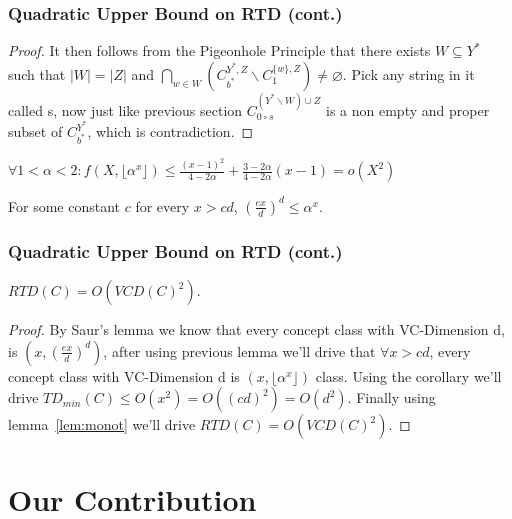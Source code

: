 \documentclass{beamer}
\begin{document}
\begin{frame}
\frametitle{Quadratic Upper Bound on RTD (cont.)}
\begin{proof}
It then follows from the Pigeonhole Principle that there exists $W \subseteq Y^*$ such that $|W| = |Z|$ and $\bigcap_{w \in W}(C^{Y^*, Z}_{b^*}\backslash C^{\{w\}, Z}_{1}) \neq \varnothing$. Pick any string in it called s, now 
just like previous section $C^{(Y^*\backslash W)\cup Z}_{0\circ s}$ is a non empty and proper subset of $C^{Y^*}_{b^*}$, which is contradiction.
\end{proof}
\begin{corollary}
$\forall 1<\alpha<2: f(X, \lfloor \alpha^ x\rfloor) \leq \frac{(x-1)^2}{4 - 2\alpha} + \frac{3 - 2\alpha}{4 - 2\alpha}(x-1) = o(X^2)$
\end{corollary}
\begin{lemma}
For some constant $c$ for every $x > cd$, $(\frac{ex}{d})^d \leq \alpha^x$.
\end{lemma}

\end{frame}


\begin{frame}
\frametitle{Quadratic Upper Bound on RTD (cont.)}
\begin{theorem}
$RTD(C) = O(VCD(C)^2)$.
\end{theorem}
\begin{proof}
By Saur's lemma we know that every concept class with VC-Dimension d, is $(x, (\frac{ex}{d})^d)$, after using previous lemma we'll drive that $\forall x > cd$, every concept class with VC-Dimension d is $(x, \lfloor \alpha^x \rfloor)$ class. Using the corollary we'll drive $TD_{min}(C) \leq O(x^2) = O((cd)^2) = O(d^2)$. Finally using lemma~\ref{lem:monot} we'll drive $RTD(C) = O(VCD(C)^2)$.
\end{proof}
\end{frame}

\section{Our Contribution}
\end{document}
